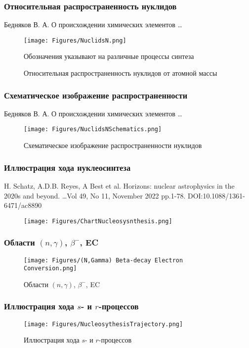 \begin{frame}
\frametitle{Относительная распространенность нуклидов}
Бедняков В. А. О происхождении химических элементов \ldots
	\begin{figure}[ht] 
		\centering\small
		\unitlength=1mm
		\texttt{[image: Figures/NuclidsN.png]} 
		\caption{Относительная распространенность нуклидов от атомной массы \cite{ElementsOrigin}}
			Обозначения указывают на различные процессы синтеза 
		\label{f:NuclidsN}
	\end{figure}

\end{frame}

\begin{frame}
\frametitle{Схематическое изображение распространенности }
Бедняков В. А. О происхождении химических элементов \ldots
\begin{figure}[ht] 
		\centering\small
		\unitlength=1mm
		\texttt{[image: Figures/NuclidsNSchematics.png]} 
		\caption{Схематическое изображение распространенности нуклидов}
		\label{f:NuclidsNSchematics}
	\end{figure}
\end{frame}

\begin{frame}
\frametitle{Иллюстрация хода нуклеосинтеза}
{\footnotesize
H. Schatz, A.D.B. Reyes, A Best et al. Horizons: nuclear astrophysics in the 2020s and beyond. \ldots  Vol 49, No 11, November 2022 pp.1-78. DOI:10.1088/1361-6471/ac8890}
\begin{figure}[h] 
	\centering\small
	\unitlength=1mm
	\texttt{[image: Figures/ChartNucleosysnthesis.png]} 
	\label{f:ChartNucleosysnthesis}
\end{figure}
\end{frame}

\begin{frame}
\frametitle{Области $(n,\gamma)$, $\beta^{-}$, EC}
	\begin{figure}[h] 
		\centering\small
		\unitlength=1mm
		\texttt{[image: Figures/(N,Gamma) Beta-decay Electron Conversion.png]} 
		\caption{Области $(n,\gamma)$, $\beta^{-}$, EC} 
		\label{f:(N,Gamma) Beta-decay Electron Conversion}
	\end{figure}
\end{frame}



\begin{frame}
\frametitle{Иллюстрация хода $s$- и $r$-процессов}
\begin{figure}[h] 
	\centering\small
	\unitlength=1mm
	\texttt{[image: Figures/NucleosythesisTrajectory.png]} 
	\caption{Иллюстрация хода $s$- и $r$-процессов} 
	\label{f:NucleosythesisTrajector}
\end{figure}

\end{frame}

